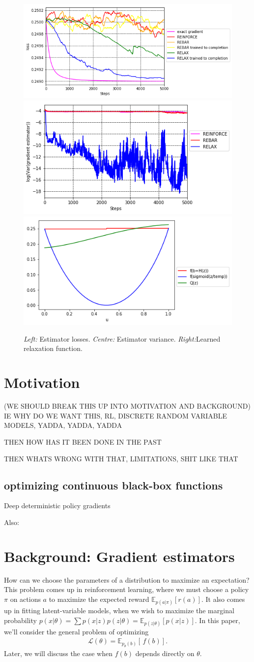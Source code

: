 \documentclass{article}
\newcommand{\discreteDist}{p_{\theta}(b)}
\newcommand{\loss}{f(b)}
\newcommand{\expectedLoss}{\mathbb{E}_{\discreteDist{}} \! \left[ \, \loss{} \right]}
\begin{document}
\begin{figure}[h]
\begin{center}
\includegraphics[width=.3\textwidth]{figures/losses}
\includegraphics[width=.3\textwidth]{figures/variance_no_opt}
\includegraphics[width=.3\textwidth]{figures/learned_r}
\label{first figure}
\end{center}
\caption{
\emph{Left:} Estimator losses.
\emph{Centre:} Estimator variance.
\emph{Right:}Learned relaxation function.
}
\end{figure}

\section{Motivation}
(WE SHOULD BREAK THIS UP INTO MOTIVATION AND BACKGROUND)
IE 	WHY DO WE WANT THIS, RL, DISCRETE RANDOM VARIABLE MODELS, YADDA, YADDA, YADDA

THEN HOW HAS IT BEEN DONE IN THE PAST

THEN WHATS WRONG WITH THAT, LIMITATIONS, SHIT LIKE THAT
\subsection{optimizing continuous black-box functions}
\label{continuous}
Deep deterministic policy gradients \citep{lillicrap2015continuous}

Also: \citep{levine2016end}

\section{Background: Gradient estimators}


How can we choose the parameters of a distribution to maximize an expectation?
This problem comes up in reinforcement learning, where we must choose a policy $\pi$ on actions $a$ to maximize the expected reward $\mathbb{E}_{p(a|\pi)} \left[ r(a) \right]$.
It also comes up in fitting latent-variable models, when we wish to maximize the marginal probability ${p(x|\theta) = \sum p(x|z) p(z|\theta) = \mathbb{E}_{p(z|\theta)} \left[ p(x|z) \right]}$.
In this paper, we'll consider the general problem of optimizing
%
\begin{align}
\mathcal{L}(\theta)=\expectedLoss{}.
\end{align}
%
Later, we will discuss the case when $\loss{}$ depends directly on $\theta$.
\end{document}
